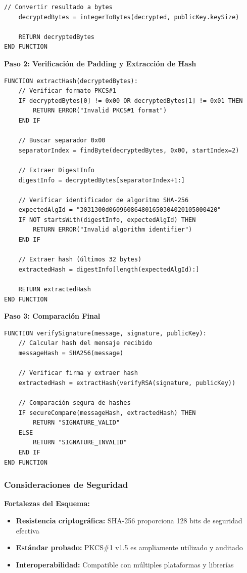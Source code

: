 {\begin{lstlisting}[language=pseudocode, caption=Verificación de firma RSA]
    // Convertir resultado a bytes
    decryptedBytes = integerToBytes(decrypted, publicKey.keySize)
    
    RETURN decryptedBytes
END FUNCTION
\end{lstlisting}

\textbf{Paso 2: Verificación de Padding y Extracción de Hash}
\begin{lstlisting}[language=pseudocode, caption=Extracción del hash original]
FUNCTION extractHash(decryptedBytes):
    // Verificar formato PKCS#1
    IF decryptedBytes[0] != 0x00 OR decryptedBytes[1] != 0x01 THEN
        RETURN ERROR("Invalid PKCS#1 format")
    END IF
    
    // Buscar separador 0x00
    separatorIndex = findByte(decryptedBytes, 0x00, startIndex=2)
    
    // Extraer DigestInfo
    digestInfo = decryptedBytes[separatorIndex+1:]
    
    // Verificar identificador de algoritmo SHA-256
    expectedAlgId = "3031300d060960864801650304020105000420"
    IF NOT startsWith(digestInfo, expectedAlgId) THEN
        RETURN ERROR("Invalid algorithm identifier")
    END IF
    
    // Extraer hash (últimos 32 bytes)
    extractedHash = digestInfo[length(expectedAlgId):]
    
    RETURN extractedHash
END FUNCTION
\end{lstlisting}

\textbf{Paso 3: Comparación Final}
\begin{lstlisting}[language=pseudocode, caption=Verificación de integridad]
FUNCTION verifySignature(message, signature, publicKey):
    // Calcular hash del mensaje recibido
    messageHash = SHA256(message)
    
    // Verificar firma y extraer hash
    extractedHash = extractHash(verifyRSA(signature, publicKey))
    
    // Comparación segura de hashes
    IF secureCompare(messageHash, extractedHash) THEN
        RETURN "SIGNATURE_VALID"
    ELSE
        RETURN "SIGNATURE_INVALID"
    END IF
END FUNCTION
\end{lstlisting}

\subsubsection{Consideraciones de Seguridad}

\textbf{Fortalezas del Esquema:}
\begin{itemize}
    \item \textbf{Resistencia criptográfica:} SHA-256 proporciona 128 bits de seguridad efectiva
    \item \textbf{Estándar probado:} PKCS\#1 v1.5 es ampliamente utilizado y auditado
    \item \textbf{Interoperabilidad:} Compatible con múltiples plataformas y librerías
\end{itemize}

}
